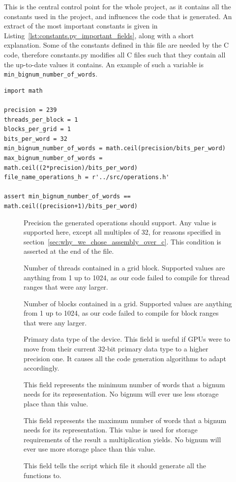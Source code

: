 \documentclass[10pt, a4paper]{report}
\begin{document}
\begin{description}
\item[]
This is the central control point for the whole project, as it contains all the
constants used in the project, and influences the code that is generated.
An extract of the most important constants is given in
Listing~\ref{lst:constants.py_important_fields}, along with a short explanation.
Some of the constants defined in this file are needed by the C code, therefore
constants.py modifies all C files such that they contain all the up-to-date
values it contains.
An example of such a variable is \verb+min_bignum_number_of_words+.

\lstset{language=Python}
\begin{lstlisting}
import math

precision = 239
threads_per_block = 1
blocks_per_grid = 1
bits_per_word = 32
min_bignum_number_of_words = math.ceil(precision/bits_per_word)
max_bignum_number_of_words = math.ceil((2*precision)/bits_per_word)
file_name_operations_h = r'../src/operations.h'

assert min_bignum_number_of_words == math.ceil((precision+1)/bits_per_word)
\end{lstlisting}

\begin{description}
\item[] Precision the generated operations should support.
Any value is supported here, except all multiples of 32, for reasons specified
in section~\ref{sec:why_we_chose_assembly_over_c}.
This condition is asserted at the end of the file.
\item[] Number of threads contained in a grid block.
Supported values are anything from 1 up to 1024, as our code failed to compile
for thread ranges that were any larger.
\item[] Number of blocks contained in a grid.
Supported values are anything from 1 up to 1024, as our code failed to compile
for block ranges that were any larger.
\item[] Primary data type of the device.
This field is useful if GPUs were to move from their current  32-bit primary
data type to a higher precision one.
It causes all the code generation algorithms to adapt accordingly.
\item[] This field represents the minimum number
of words that a bignum needs for its representation.
No bignum will ever use less storage place than this value.
\item[] This field represents the maximum number
of words that a bignum needs for its representation.
This value is used for storage requirements of the result a multiplication
yields.
No bignum will ever use more storage place than this value.
\item[] This field tells the script which file it
should generate all the functions to.
\end{description}


\end{description}
\end{document}
